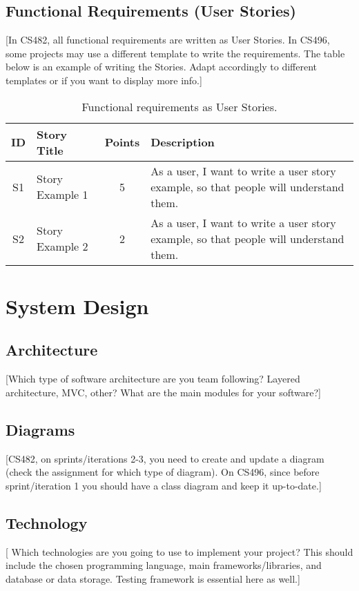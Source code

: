 \documentclass{article}
\begin{document}
\subsection{Functional Requirements (User Stories)}
[In CS482, all functional requirements are written as User Stories. In CS496, some projects may use a different template to write the requirements. The table below is an example of writing the Stories. Adapt accordingly to different templates or if you want to display more info.]

\begin{table}[h!]
\centering
\begin{tabular}{c l c p{10cm}}
\hline
\textbf{ID} & \textbf{Story Title} & \textbf{Points} & \textbf{Description} \\
\hline
S1 & Story Example 1 & 5 & As a user, I want to write a user story example, so that people will understand them. \\ \hline
S2 & Story Example 2 & 2 & As a user, I want to write a user story example, so that people will understand them. \\ \hline

\end{tabular}
\caption{Functional requirements as User Stories.}
\end{table}

\section{System Design}

\subsection{Architecture}
[Which type of software architecture are you team following? Layered architecture, MVC, other? What are the main modules for your software?]

\subsection{Diagrams}
[CS482, on sprints/iterations 2-3, you need to create and update a diagram (check the assignment for which type of diagram). On CS496, since before sprint/iteration 1 you should have a class diagram and keep it up-to-date.]

\subsection{Technology}
[ Which technologies are you going to use to implement your project? This should include the chosen programming language, main frameworks/libraries, and database or data storage. Testing framework is essential here as well.]
\end{document}
